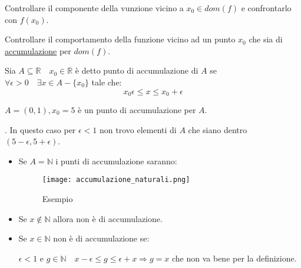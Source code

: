 \documentclass[../main.tex, class=article, 12pt]{subfiles}
\begin{document}
Controllare il componente della vunzione vicino a $ x_0 \in dom(f) $ e confrontarlo con $ f(x_0) $.

\begin{definition}
        Controllare il comportamento della funzione vicino ad un punto $ x_0 $ che sia di \underline{accumulazione} per $ dom(f) $.
\end{definition}

\begin{definition}
        Sia $ A \subseteq \mathbb{R} \quad x_0 \in \mathbb{R}$ è detto punto di accumulazione di $ A $ se $ \forall \epsilon > 0 \quad \exists x \in A - \{x_0\} $ tale che:
        \begin{equation*}
                x_0 \epsilon \le x \le x_0 + \epsilon
        \end{equation*}
\end{definition}

\begin{exmp}
        $ A = (0, 1), x_0 = 5$ è un punto di accumulazione per $ A $.\par
{}.\newline
In questo caso per $ \epsilon < 1$ non trovo elementi di $ A $ che siano dentro $(5-\epsilon, 5+\epsilon)$. 
\end{exmp}

\begin{exmp}
\end{exmp}

\begin{itemize}
        \item Se $ A = \mathbb{N} $ i punti di accumulazione saranno: 
                \begin{figure}[h]
                  	\texttt{[image: accumulazione\_naturali.png]}
                  	\caption{Esempio}
                        \label{fig:accumulazione_naturali}
                \end{figure}
        \item Se $ x \not \in \mathbb{N} $  allora non è di accumulazione.

        \item Se $ x \in \mathbb{N} $ non è di accumulazione se:\par $ \epsilon < 1 $ e $ g \in \mathbb{N} \quad x - \epsilon \le g \le \epsilon + x \Rightarrow g = x$ che non va bene per la definizione. 

\end{itemize}
\end{document}

